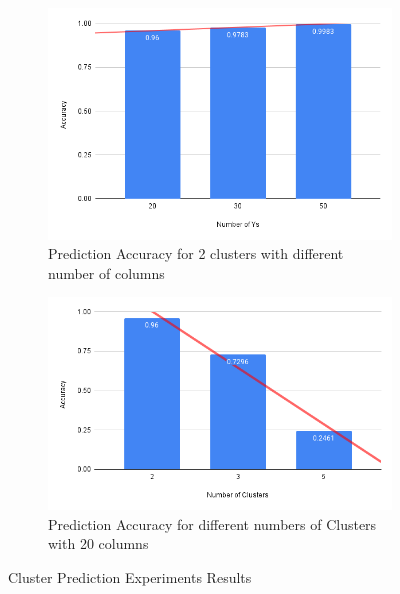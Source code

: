 \documentclass{article}
\begin{document}
\begin{figure}[htbp!]
  \centering
  \begin{subfigure}{0.49\textwidth}
      \centering
      \includegraphics[width=\textwidth]{images/experiments/dif_ys.png}
      \caption{Prediction Accuracy for 2 clusters with different number of columns}
  \end{subfigure}
  \hfill
  \begin{subfigure}{0.49\textwidth}
      \centering
      \includegraphics[width=\textwidth]{images/experiments/exp_diff_clusters.png} %
      \caption{Prediction Accuracy for different numbers of Clusters with 20 columns}
  \end{subfigure}
  \caption{Cluster Prediction Experiments Results}
  \label{fig:exp_res}
\end{figure}
\end{document}
